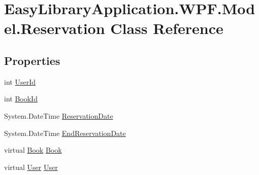 \hypertarget{class_easy_library_application_1_1_w_p_f_1_1_model_1_1_reservation}{}\section{Easy\+Library\+Application.\+W\+P\+F.\+Model.\+Reservation Class Reference}
\label{class_easy_library_application_1_1_w_p_f_1_1_model_1_1_reservation}
\subsection*{Properties}
\begin{DoxyCompactItemize}
\item 
int \mbox{\hyperlink{class_easy_library_application_1_1_w_p_f_1_1_model_1_1_reservation_a41e0164601307c9dd9c873d9035c8e11}{User\+Id}}
\item 
int \mbox{\hyperlink{class_easy_library_application_1_1_w_p_f_1_1_model_1_1_reservation_abb0d96c89019be3c14524b5e855739fd}{Book\+Id}}
\item 
System.\+Date\+Time \mbox{\hyperlink{class_easy_library_application_1_1_w_p_f_1_1_model_1_1_reservation_a579122bbc7db133757ff7162fd0692f0}{Reservation\+Date}}
\item 
System.\+Date\+Time \mbox{\hyperlink{class_easy_library_application_1_1_w_p_f_1_1_model_1_1_reservation_acf51476e59a7fab45256a7a0b6470c28}{End\+Reservation\+Date}}
\item 
virtual \mbox{\hyperlink{class_easy_library_application_1_1_w_p_f_1_1_model_1_1_book}{Book}} \mbox{\hyperlink{class_easy_library_application_1_1_w_p_f_1_1_model_1_1_reservation_ae84850409f2a19f323cf641a7ef4994f}{Book}}
\item 
virtual \mbox{\hyperlink{class_easy_library_application_1_1_w_p_f_1_1_model_1_1_user}{User}} \mbox{\hyperlink{class_easy_library_application_1_1_w_p_f_1_1_model_1_1_reservation_ae7bd8e1f4a6ff8ea5206c55724115f31}{User}}
\end{DoxyCompactItemize}


